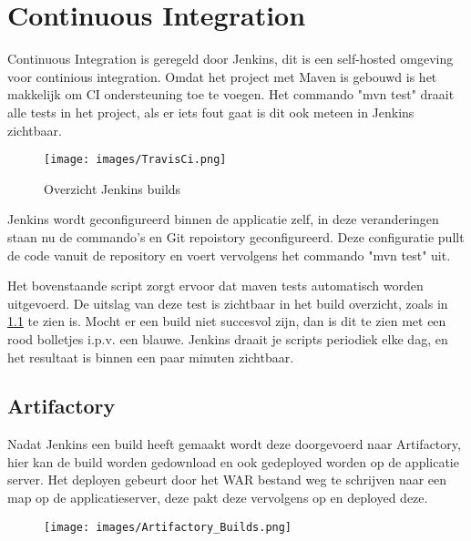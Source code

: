 \chapter{Continuous Integration}
Continuous Integration is geregeld door Jenkins, dit is een self-hosted omgeving voor continious integration.
Omdat het project met Maven is gebouwd is het makkelijk om CI ondersteuning toe te voegen.
Het commando "mvn test" draait alle tests in het project, als er iets fout gaat is dit ook meteen in Jenkins zichtbaar.

\begin{figure}[H]
	\centering\texttt{[image: images/TravisCi.png]}
	\caption{Overzicht Jenkins builds}
	\label{fig:jenkins-commits}
\end{figure}
Jenkins wordt geconfigureerd binnen de applicatie zelf, in deze veranderingen staan nu de commando's en Git repoistory geconfigureerd.
Deze configuratie pullt de code vanuit de repository en voert vervolgens het commando "mvn test" uit.
\par
Het bovenstaande script zorgt ervoor dat maven tests automatisch worden uitgevoerd.
De uitslag van deze test is zichtbaar in het build overzicht, zoals in \cref{fig:jenkins-commits} te zien is. Mocht er een build niet succesvol zijn, dan is dit te zien met een rood bolletjes i.p.v. een blauwe.
Jenkins draait je scripts periodiek elke dag, en het resultaat is binnen een paar minuten zichtbaar.

\section{Artifactory}
Nadat Jenkins een build heeft gemaakt wordt deze doorgevoerd naar Artifactory, hier kan de build worden gedownload en ook gedeployed worden op de applicatie server.
Het deployen gebeurt door het WAR bestand weg te schrijven naar een map op de applicatieserver, deze pakt deze vervolgens op en deployed deze.
\begin{figure}[H]
	\centering\texttt{[image: images/Artifactory\_Builds.png]}
\end{figure}